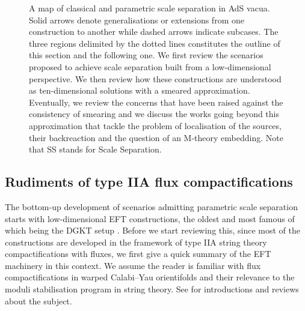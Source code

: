 \documentclass[11pt, a4paper]{article}
\begin{document}
\begin{figure}[!ht]
{
}
\caption{A map of classical and parametric scale separation in AdS vacua. Solid arrows denote generalisations or extensions from one construction to another while dashed arrows indicate subcases. The three regions delimited by the dotted lines constitutes the outline of this section and the following one. We first review the scenarios proposed to achieve scale separation built from a low-dimensional perspective. We then review how these constructions are understood as ten-dimensional solutions with a smeared approximation. Eventually, we review the concerns that have been raised against the consistency of smearing and we discuss the works going beyond this approximation that tackle the problem of localisation of the sources, their backreaction and the question of an M-theory embedding. Note that SS stands for Scale Separation.}
\label{fig:map}
\end{figure}

\subsection{Rudiments of type IIA flux compactifications}
\label{sec:4d}

The bottom-up development of scenarios admitting parametric scale separation starts with low-dimensional EFT constructions, the oldest and most famous of which being the DGKT setup \cite{DeWolfe:2005uu}. Before we start reviewing this, since most of the constructions are developed in the framework of type IIA string theory compactifications with fluxes, we first give a quick summary of the EFT machinery in this context. We assume the reader is familiar with flux compactifications in warped Calabi--Yau orientifolds and their relevance to the moduli stabilisation program in string theory. See \cite{Grana:2005jc,Douglas:2006es,Blumenhagen:2006ci,Becker:2006dvp,Marchesano:2007de,Denef:2008wq,Denef:2007pq,Ibanez:2012zz,Quevedo:2014xia,Baumann:2014nda,VanRiet:2023pnx} for introductions and reviews about the subject.
\end{document}

